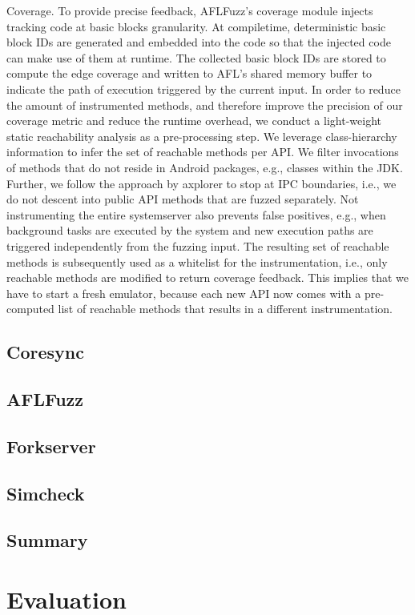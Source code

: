 \documentclass[runningheads]{llncs}
\begin{document}
Coverage. To provide precise feedback, AFLFuzz’s coverage module injects tracking code at basic blocks granularity. At compiletime, deterministic basic block IDs are generated and embedded into the code so that the injected code can make use of them at runtime. The collected basic block IDs are stored to compute the edge coverage and written to AFL’s shared memory buffer to indicate the path of execution triggered by the current input. In order to reduce the amount of instrumented methods, and therefore improve the precision of our coverage metric and reduce the runtime overhead, we conduct a light-weight static reachability analysis as a pre-processing step. We leverage class-hierarchy information to infer the set of reachable methods per API. We filter invocations of methods that do not reside in Android packages, e.g., classes within the JDK. Further, we follow the approach by axplorer \cite{backes2016demystifying} to stop at IPC boundaries, i.e., we do not descent into public API methods that are fuzzed separately. Not instrumenting the entire systemserver also prevents false positives, e.g., when background tasks are executed by the system and new execution paths are triggered independently from the fuzzing input. The resulting set of reachable methods is subsequently used as a whitelist for the instrumentation, i.e., only reachable methods are modified to return coverage feedback. This implies that we have to start a fresh emulator, because each new API now comes with a pre-computed list of reachable methods that results in a different instrumentation.

\subsection{Coresync}
\subsection{AFLFuzz}
\subsection{Forkserver}
\subsection{Simcheck}
\subsection{Summary}
\section{Evaluation}
\end{document}
